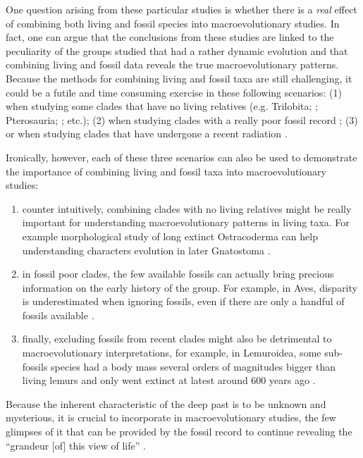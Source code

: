 One question arising from these particular studies is whether there is a \textit{real} effect of combining both living and fossil species into macroevolutionary studies.
In fact, one can argue that the conclusions from these studies are linked to the peculiarity of the groups studied that had a rather dynamic evolution and that combining living and fossil data reveals the true macroevolutionary patterns.
Because the methods for combining living and fossil taxa are still challenging, it could be a futile and time consuming exercise in these following scenarios: (1) when studying some clades that have no living relatives (e.g. Trilobita; \citealt{hopkinsdecoupling2013}; Pterosauria; \citealt{Butler2012}; etc.); (2) when studying clades with a really poor fossil record \citep[e.g. Aves where there are three orders of magnitude more known living than fossil taxa;][]{jetzthe2012,Mitchell2015}; (3) or when studying clades that have undergone a recent radiation \citep[e.g. Cichlidae][]{Genner01052007}.

Ironically, however, each of these three scenarios can also be used to demonstrate the importance of combining living and fossil taxa into macroevolutionary studies:
\begin{enumerate}
\item counter intuitively, combining clades with no living relatives might be really important for understanding macroevolutionary patterns in living taxa. For example morphological study of long extinct Ostracoderma can help understanding characters evolution in later Gnatostoma \citep{Janvier2015}.
\item in fossil poor clades, the few available fossils can actually bring precious information on the early history of the group. For example, in Aves, disparity is underestimated when ignoring fossils, even if there are only a handful of fossils available \citep[e.g. 58 fossil genera against 604 living ones;][]{Mitchell2015}.
\item finally, excluding fossils from recent clades might also be detrimental to macroevolutionary interpretations, for example, in Lemuroidea, some sub-fossils species had a body mass several orders of magnitudes bigger than living lemurs \citep{hartwig2002primate,Jungers2008} and only went extinct at latest around 600 years ago \citep{goodman2003introduction}.
\end{enumerate}

Because the inherent characteristic of the deep past is to be unknown and mysterious, it is crucial to incorporate in macroevolutionary studies, the few glimpses of it that can be provided by the fossil record to continue revealing the ``grandeur [of] this view of life'' \citep{darwin}.

